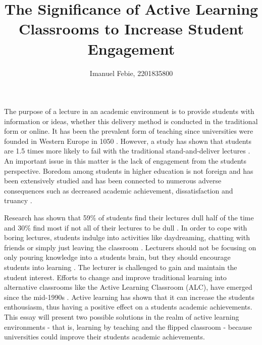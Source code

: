 \documentclass[12pt]{article}
\begin{document}
\title{The Significance of Active Learning Classrooms to Increase Student Engagement}
\author{Imanuel Febie, 2201835800}
\maketitle

The purpose of a lecture in an academic environment is to provide students with information or ideas, whether this delivery method is conducted in the traditional form or online. It has been the prevalent form of teaching since universities were founded in Western Europe in 1050 \cite{bajak2014lectures}. However, a study has shown that students are 1.5 times more likely to fail with the traditional stand-and-deliver lectures \cite{freeman-active-learning-2014}. An important issue in this matter is the lack of engagement from the students perspective. Boredom among students in higher education is not foreign and has been extensively studied and has been connected to numerous adverse consequences such as decreased academic achievement, dissatisfaction and truancy \cite{boredom-among-students}. 

Research has shown that 59\% of students find their lectures dull half of the time and 30\% find most if not all of their lectures to be dull \cite{boredom-among-students}. In order to cope with boring lectures, students indulge into activities like daydreaming, chatting with friends or simply just leaving the classroom \cite{predictors-of-boredom}. Lecturers should not be focusing on only pouring knowledge into a students brain, but they should encourage students into learning \cite{satisfaction-active-learning}. The lecturer is challenged to gain and maintain the student interest. Efforts to change and improve traditional learning into alternative classrooms like the Active Learning Classroom (ALC), have emerged since the mid-1990s \cite{guide-to-teaching-alc}. Active learning has shown that it can increase the students enthousiasm, thus having a positive effect on a students academic achievements. This essay will present two possible solutions in the realm of active learning environments - that is, learning by teaching and the flipped classroom - because universities could improve their students academic achievements.
\end{document}
